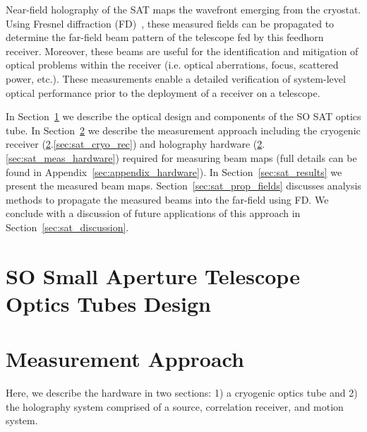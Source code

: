 Near-field holography of the SAT maps the wavefront emerging from the cryostat.  Using Fresnel diffraction (FD)~\cite{Goodman2005-ne}, these measured fields can be propagated to determine the far-field beam pattern of the telescope fed by this feedhorn receiver.  Moreover, these beams are useful for the identification and mitigation of optical problems within the receiver (i.e. optical aberrations, focus, scattered power, etc.).  These measurements enable a detailed verification of system-level optical performance prior to the deployment of a receiver on a telescope.

In Section~\ref{sec:sat_optics_tube} we describe the optical design and components of the SO SAT optics tube.  In Section~\ref{sec:satot_meas_method} we describe the measurement approach including the cryogenic receiver (\ref{sec:satot_meas_method}.\ref{sec:sat_cryo_rec}) and holography hardware (\ref{sec:satot_meas_method}.\ref{sec:sat_meas_hardware}) required for measuring beam maps (full details can be found in Appendix~\ref{sec:appendix_hardware}).  In Section~\ref{sec:sat_results} we present the measured beam maps.   Section~\ref{sec:sat_prop_fields} discusses analysis methods to propagate the measured beams into the far-field using FD.  We conclude with a discussion of future applications of this approach in Section~\ref{sec:sat_discussion}.  
\section{SO Small Aperture Telescope Optics Tubes Design}
\label{sec:sat_optics_tube}

\section{Measurement Approach}
\label{sec:satot_meas_method}
Here, we describe the hardware in two sections: 1) a cryogenic optics tube and 2) the holography system comprised of a source, correlation receiver, and motion system.
